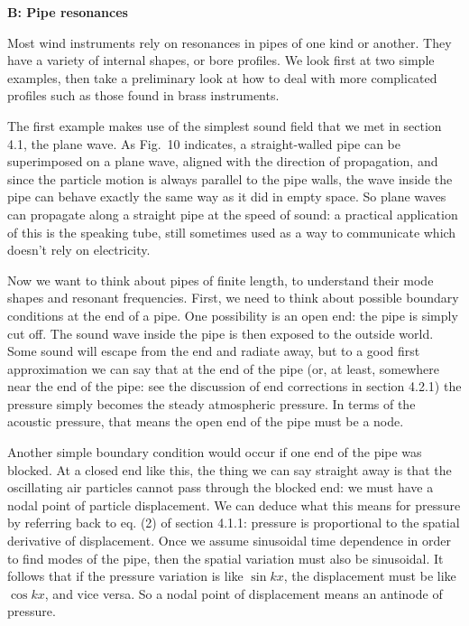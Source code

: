   \textbf{B: Pipe resonances} 

  Most wind instruments rely on resonances in pipes of one kind or another. 
  They have a variety of internal shapes, or bore profiles. We look first at 
  two simple examples, then take a preliminary look at how to deal with more 
  complicated profiles such as those found in brass instruments. 

  The first example makes use of the simplest sound field that we met in 
  section 4.1, the plane wave. As Fig.\ 10 indicates, a straight-walled pipe 
  can be superimposed on a plane wave, aligned with the direction of 
  propagation, and since the particle motion is always parallel to the pipe 
  walls, the wave inside the pipe can behave exactly the same way as it did in 
  empty space. So plane waves can propagate along a straight pipe at the speed 
  of sound: a practical application of this is the speaking tube, still 
  sometimes used as a way to communicate which doesn't rely on electricity. 

  Now we want to think about pipes of finite length, to understand their mode 
  shapes and resonant frequencies. First, we need to think about possible 
  boundary conditions at the end of a pipe. One possibility is an open end: the 
  pipe is simply cut off. The sound wave inside the pipe is then exposed to the 
  outside world. Some sound will escape from the end and radiate away, but to a 
  good first approximation we can say that at the end of the pipe (or, at 
  least, somewhere near the end of the pipe: see the discussion of end 
  corrections in section 4.2.1) the pressure simply becomes the steady 
  atmospheric pressure. In terms of the acoustic pressure, that means the open 
  end of the pipe must be a node. 

  Another simple boundary condition would occur if one end of the pipe was 
  blocked. At a closed end like this, the thing we can say straight away is 
  that the oscillating air particles cannot pass through the blocked end: we 
  must have a nodal point of particle displacement. We can deduce what this 
  means for pressure by referring back to eq. (2) of section 4.1.1: pressure is 
  proportional to the spatial derivative of displacement. Once we assume 
  sinusoidal time dependence in order to find modes of the pipe, then the 
  spatial variation must also be sinusoidal. It follows that if the pressure 
  variation is like $\sin kx$, the displacement must be like $\cos kx$, and 
  vice versa. So a nodal point of displacement means an antinode of pressure. 

